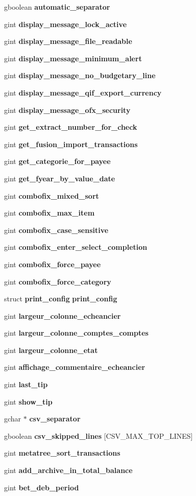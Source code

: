\begin{DoxyCompactItemize}
\item 
gboolean {\bf automatic\_\-separator}
\item 
gint {\bf display\_\-message\_\-lock\_\-active}
\item 
gint {\bf display\_\-message\_\-file\_\-readable}
\item 
gint {\bf display\_\-message\_\-minimum\_\-alert}
\item 
gint {\bf display\_\-message\_\-no\_\-budgetary\_\-line}
\item 
gint {\bf display\_\-message\_\-qif\_\-export\_\-currency}
\item 
gint {\bf display\_\-message\_\-ofx\_\-security}
\item 
gint {\bf get\_\-extract\_\-number\_\-for\_\-check}
\item 
gint {\bf get\_\-fusion\_\-import\_\-transactions}
\item 
gint {\bf get\_\-categorie\_\-for\_\-payee}
\item 
gint {\bf get\_\-fyear\_\-by\_\-value\_\-date}
\item 
gint {\bf combofix\_\-mixed\_\-sort}
\item 
gint {\bf combofix\_\-max\_\-item}
\item 
gint {\bf combofix\_\-case\_\-sensitive}
\item 
gint {\bf combofix\_\-enter\_\-select\_\-completion}
\item 
gint {\bf combofix\_\-force\_\-payee}
\item 
gint {\bf combofix\_\-force\_\-category}
\item 
struct {\bf print\_\-config} {\bf print\_\-config}
\item 
gint {\bf largeur\_\-colonne\_\-echeancier}
\item 
gint {\bf largeur\_\-colonne\_\-comptes\_\-comptes}
\item 
gint {\bf largeur\_\-colonne\_\-etat}
\item 
gint {\bf affichage\_\-commentaire\_\-echeancier}
\item 
gint {\bf last\_\-tip}
\item 
gint {\bf show\_\-tip}
\item 
gchar $\ast$ {\bf csv\_\-separator}
\item 
gboolean {\bf csv\_\-skipped\_\-lines} [CSV\_\-MAX\_\-TOP\_\-LINES]
\item 
gint {\bf metatree\_\-sort\_\-transactions}
\item 
gint {\bf add\_\-archive\_\-in\_\-total\_\-balance}
\item 
gint {\bf bet\_\-deb\_\-period}
\end{DoxyCompactItemize}


